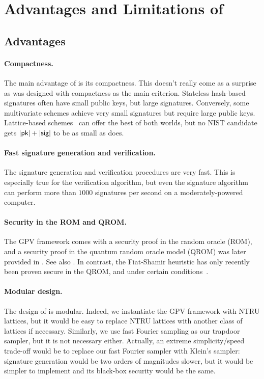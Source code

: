\section{Advantages and Limitations of \falcon}\label{sec:ratio:advantages}


\subsection{Advantages}

\paragraph{Compactness.} The main advantage of \falcon is its compactness. This doesn't really come as a surprise as \falcon was designed with compactness as the main criterion. Stateless hash-based signatures often have small public keys, but large signatures. Conversely, some multivariate schemes achieve very small signatures but require large public keys. Lattice-based schemes~\cite{NISTPQC-R2:CRYSTALS-DILITHIUM19} can offer the best of both worlds, but no NIST candidate gets $|\textsf{pk}|+|\textsf{sig}|$ to be as small as \falcon does.

\paragraph{Fast signature generation and verification.} The signature generation and verification procedures are very fast. This is especially true for the verification algorithm, but even the signature algorithm can perform more than $1000$ signatures per second on a moderately-powered computer.

\paragraph{Security in the ROM and QROM.} The GPV framework comes with a security proof in the random oracle (ROM), and a security proof in the quantum random oracle model (QROM) was later provided in \cite{AC:BDFLSZ11}. See also \cite{PKC:ChaDeb20}. In contrast, the Fiat-Shamir heuristic has only recently been proven secure in the QROM, and under certain conditions~\cite{C:LiuZha19,C:DFMS19}.

\paragraph{Modular design.} The design of \falcon is modular. Indeed, we instantiate the GPV framework with NTRU lattices, but it would be easy to replace NTRU lattices with another class of lattices if necessary. Similarly, we use fast Fourier sampling as our trapdoor sampler, but it is not necessary either. Actually, an extreme simplicity/speed trade-off would be to replace our fast Fourier sampler with Klein's sampler: signature generation would be two orders of magnitudes slower, but it would be simpler to implement and its black-box security would be the same.

